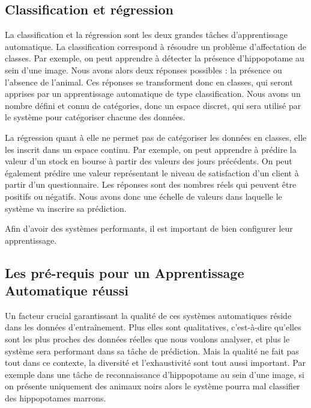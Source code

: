 \subsection{Classification et régression}
La classification et la régression sont les deux grandes tâches d'apprentissage automatique.
La classification correspond à résoudre un problème d'affectation de classes. Par exemple, on peut apprendre à détecter la présence d'hippopotame au sein d'une image. Nous avons alors deux réponses possibles : la présence ou l'absence de l'animal. Ces réponses se transforment donc en classes, qui seront apprises par un apprentissage automatique de type classification. Nous avons un nombre défini et connu de catégories, donc un espace discret, qui sera utilisé par le système pour catégoriser chacune des données.

La régression quant à elle ne permet pas de catégoriser les données en classes, elle les inscrit dans un espace continu. Par exemple, on peut apprendre à  prédire la valeur d'un stock en bourse à partir des valeurs des jours précédents. On peut également prédire une valeur représentant le niveau de satisfaction d'un client à partir d'un questionnaire. Les réponses sont des nombres réels qui peuvent être positifs ou négatifs. Nous avons donc une échelle de valeurs dans laquelle le système va inscrire sa prédiction.

%



Afin d'avoir des systèmes performants, il est important de bien configurer leur apprentissage.

\subsection{Les pré-requis pour un Apprentissage Automatique réussi}
Un facteur crucial garantissant la qualité de ces systèmes automatiques réside dans les données d’entraînement. Plus elles sont qualitatives, c'est-à-dire qu'elles sont les plus proches des données réelles que nous voulons analyser, et plus le système sera performant dans sa tâche de prédiction. Mais la qualité ne fait pas tout dans ce contexte, la diversité et l'exhaustivité sont tout aussi important. Par exemple dans une tâche de reconnaissance d'hippopotame au sein d'une image, si on présente uniquement des animaux noirs alors le système pourra mal classifier des hippopotames marrons.

